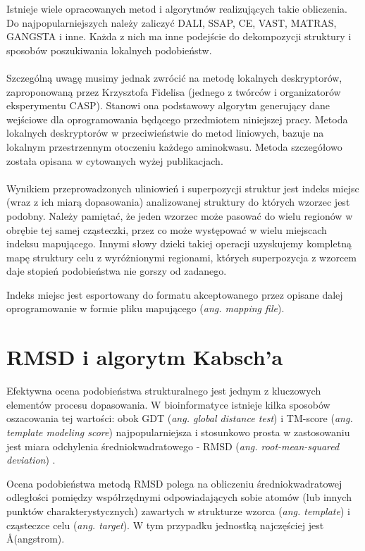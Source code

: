 \documentclass[licencjacka]{pracamgr}
\begin{document}
Istnieje wiele opracowanych metod i algorytmów realizujących takie obliczenia. Do najpopularniejszych należy zaliczyć DALI\cite{holmSander1993}, SSAP\cite{orengoTaylor1996}, CE\cite{shindyalovBourne1998}, VAST\cite{madejGibratBryant1995}, MATRAS\cite{kawabataNishikawa2000}, GANGSTA\cite{guerlerKnapp2008} i inne. Każda z nich ma inne podejście do dekompozycji struktury i sposobów poszukiwania lokalnych podobieństw. 
\\
\\
Szczególną uwagę musimy jednak zwrócić na metodę lokalnych deskryptorów, zaproponowaną przez Krzysztofa Fidelisa \cite{daniluk11}\cite{fidelis2003} (jednego z twórców i organizatorów eksperymentu CASP). Stanowi ona podstawowy algorytm generujący dane wejściowe dla oprogramowania będącego przedmiotem niniejszej pracy. Metoda lokalnych deskryptorów w przeciwieństwie do metod liniowych, bazuje na lokalnym przestrzennym otoczeniu każdego aminokwasu. Metoda szczegółowo została opisana w cytowanych wyżej publikacjach. 
\\
\\
Wynikiem przeprowadzonych uliniowień i superpozycji struktur jest indeks miejsc (wraz z ich miarą dopasowania) analizowanej struktury do których wzorzec jest podobny. Należy pamiętać, że jeden wzorzec może pasować do wielu regionów w obrębie tej samej cząsteczki, przez co może występować w wielu miejscach indeksu mapującego. Innymi słowy dzieki takiej operacji uzyskujemy kompletną mapę struktury celu z wyróżnionymi regionami, których superpozycja z wzorcem daje stopień podobieństwa nie gorszy od zadanego.

Indeks miejsc jest esportowany do formatu akceptowanego przez opisane dalej oprogramowanie w formie pliku mapującego (\textit{ang. mapping file}).

\section{RMSD i algorytm Kabsch'a}

Efektywna ocena podobieństwa strukturalnego jest jednym z kluczowych elementów procesu dopasowania. W bioinformatyce istnieje kilka sposobów oszacowania tej wartości: obok GDT (\textit{ang. global distance test}) i TM-score (\textit{ang. template modeling score}) \cite{zhangSkolnick2005} najpopularniejsza i stosunkowo prosta w zastosowaniu jest miara odchylenia średniokwadratowego - RMSD (\textit{ang. root-mean-squared deviation}) \cite{kufarevaAbagyan2012}. 

Ocena podobieństwa metodą RMSD polega na obliczeniu średniokwadratowej odległości pomiędzy współrzędnymi odpowiadających sobie atomów (lub innych punktów charakterystycznych) zawartych w strukturze wzorca (\textit{ang. template}) i cząsteczce celu (\textit{ang. target}). W tym przypadku jednostką najczęściej jest \AA (angstrom). 
\end{document}

